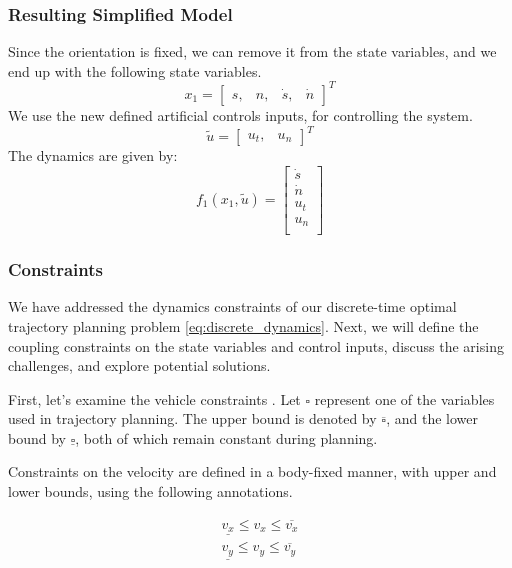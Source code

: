 \subsubsection{Resulting Simplified Model}

Since the orientation is fixed, we can remove it from the state variables, and we end up with the following state variables.
\[
	x_1 = \begin{bmatrix} s, & n, & \dot{s}, & \dot{n} \end{bmatrix}^T
\]
We use the new defined artificial controls inputs, for controlling the system.
\[
	\tilde{u} = \begin{bmatrix} u_t, & u_n \end{bmatrix}^T
\]
The dynamics are given by:
\begin{equation}
	f_1(x_1, \tilde{u}) = \begin{bmatrix}
		\dot{s} \\
		\dot{n} \\
		u_t     \\
		u_n     \\
	\end{bmatrix}
	\label{eq:pm_final_dynamics}
\end{equation}

\subsubsection{Constraints}

We have addressed the dynamics constraints of our discrete-time optimal trajectory planning problem \eqref{eq:discrete_dynamics}.
Next, we will define the coupling constraints on the state variables and control inputs, discuss the arising challenges, and explore potential
solutions.

First, let's examine the vehicle constraints \cite{eilbrecht_challenges_2020}.
Let $\square$ represent one of the variables used in trajectory planning.
The upper bound is denoted by $\overline{\square}$, and the lower bound by $\underline{\square}$, both of which remain constant during planning.

Constraints on the velocity are defined in a body-fixed manner, with upper and lower bounds, using the following annotations.

\begin{align}
	\underline{v_x} \leq v_x \leq \overline{v_x} \\
	\underline{v_y} \leq v_y \leq \overline{v_y}
\end{align}

